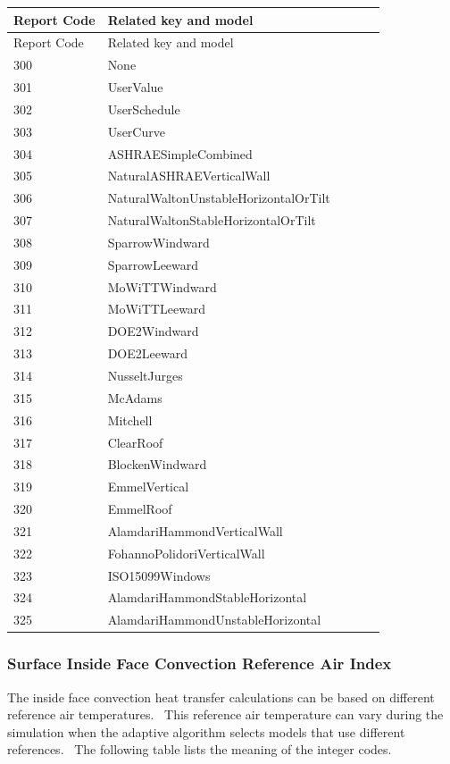 \begin{longtable}[c]{@{}ll@{}}
\toprule 
Report Code & Related key and model \tabularnewline
\midrule
\endfirsthead

\toprule 
Report Code & Related key and model \tabularnewline
\midrule
\endhead

300 & None~ \tabularnewline
301 & UserValue \tabularnewline
302 & UserSchedule \tabularnewline
303 & UserCurve~~~~~~~~~~~~~~~~~~~~~~~~~~~~~~ \tabularnewline
304 & ASHRAESimpleCombined~~~~~~~~~~~~~~~~~~~ \tabularnewline
305 & NaturalASHRAEVerticalWall~~~~~~~~~~~~~~ \tabularnewline
306 & NaturalWaltonUnstableHorizontalOrTilt~~ \tabularnewline
307 & NaturalWaltonStableHorizontalOrTilt~~~~ \tabularnewline
308 & SparrowWindward~~~~~~~~~~~~~~~~~~~~~~~~ \tabularnewline
309 & SparrowLeeward~~~~~~~~~~~~~~~~~~~~~~~~~ \tabularnewline
310 & MoWiTTWindward~~~~~~~~~~~~~~~~~~~~~~~~~ \tabularnewline
311 & MoWiTTLeeward~~~~~~~~~~~~~~~~~~~~~~~~~~ \tabularnewline
312 & DOE2Windward~~~~~~~~~~~~~~~~~~~~~~~~~~~ \tabularnewline
313 & DOE2Leeward~~~~~~~~~~~~~~~~~~~~~~~~~~~~ \tabularnewline
314 & NusseltJurges~~~~~~~~~~~~~~~~~~~~~~~~~~ \tabularnewline
315 & McAdams~~~~~~~~~~~~~~~~~~~~~~~~~~~~~~~~ \tabularnewline
316 & Mitchell~~~~~~~~~~~~~~~~~~~~~~~~~~~~~~~ \tabularnewline
317 & ClearRoof~~~~~~~~~~~~~~~~~~~~~~~~~~~~~~ \tabularnewline
318 & BlockenWindward~~~~~~~~~~~~~~~~~~~~~~~~ \tabularnewline
319 & EmmelVertical~~~~~~~~~~~~ ~~~~~~~~~~~~~~ \tabularnewline
320 & EmmelRoof~~~~~~~~~~~~~~~~~~~~~~~~~~~~~~ \tabularnewline
321 & AlamdariHammondVerticalWall~~~~~~~~~~~~ \tabularnewline
322 & FohannoPolidoriVerticalWall~~~~~~~~~~~~ \tabularnewline
323 & ISO15099Windows~~~~~~~~~~~~~~~~~~~~~~~~ \tabularnewline
324 & AlamdariHammondStableHorizontal~~~~~~~~ \tabularnewline
325 & AlamdariHammondUnstableHorizontal~~~~~~ \tabularnewline
\bottomrule
\end{longtable}

\subsubsection{Surface Inside Face Convection Reference Air Index}\label{surface-inside-face-convection-reference-air-index}

The inside face convection heat transfer calculations can be based on different reference air temperatures.~ This reference air temperature can vary during the simulation when the adaptive algorithm selects models that use different references.~ The following table lists the meaning of the integer codes.

